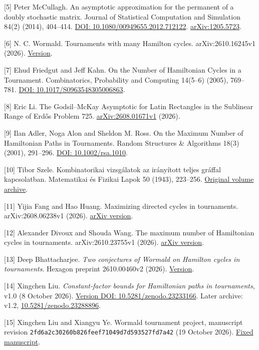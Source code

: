 \documentclass[11pt,a4paper]{article}
\begin{document}
{[}5{]} Peter McCullagh. An asymptotic approximation for the permanent of a doubly stochastic matrix. Journal of Statistical Computation and Simulation 84(2) (2014), 404--414. \href{https://doi.org/10.1080/00949655.2012.712122}{DOI: 10.1080/00949655.2012.712122}. \href{https://arxiv.org/abs/1205.5723}{arXiv:1205.5723}.

{[}6{]} N. C. Wormald. Tournaments with many Hamilton cycles. arXiv:2610.16245v1 (2026). \href{https://arxiv.org/html/2610.16245v1}{Version}.

{[}7{]} Ehud Friedgut and Jeff Kahn. On the Number of Hamiltonian Cycles in a Tournament. Combinatorics, Probability and Computing 14(5--6) (2005), 769--781. \href{https://doi.org/10.1017/S0963548305006863}{DOI: 10.1017/S0963548305006863}.

{[}8{]} Eric Li. The Godsil--McKay Asymptotic for Latin Rectangles in the Sublinear Range of Erdős Problem 725. \href{https://arxiv.org/html/2608.01671v1}{arXiv:2608.01671v1} (2026).

{[}9{]} Ilan Adler, Noga Alon and Sheldon M. Ross. On the Maximum Number of Hamiltonian Paths in Tournaments. Random Structures \& Algorithms 18(3) (2001), 291--296. \href{https://doi.org/10.1002/rsa.1010}{DOI: 10.1002/rsa.1010}.

{[}10{]} Tibor Szele. Kombinatorikai vizsgálatok az irányított teljes gráffal kapcsolatban. Matematikai és Fizikai Lapok 50 (1943), 223--256. \href{https://real-j.mtak.hu/7300/}{Original volume archive}.

{[}11{]} Yijia Fang and Hao Huang. Maximizing directed cycles in tournaments. arXiv:2608.06238v1 (2026). \href{https://arxiv.org/html/2608.06238v1\#S3}{arXiv version}.

{[}12{]} Alexander Divoux and Shouda Wang. The maximum number of Hamiltonian cycles in tournaments. arXiv:2610.23755v1 (2026). \href{https://arxiv.org/html/2610.23755v1}{arXiv version}.

{[}13{]} Deep Bhattacharjee. \emph{Two conjectures of Wormald on Hamilton cycles in tournaments}. Hexagon preprint 2610.00460v2 (2026). \href{https://hexagonmath.org/2610.00460v2}{Version}.

{[}14{]} Xingchen Liu. \emph{Constant-factor bounds for Hamiltonian paths in tournaments}, v1.0 (8 October 2026). \href{https://doi.org/10.5281/zenodo.23233166}{Version DOI: 10.5281/zenodo.23233166}. Later archive: v1.2, \href{https://doi.org/10.5281/zenodo.23288896}{10.5281/zenodo.23288896}.

{[}15{]} Xingchen Liu and Xiangyu Ye. Wormald tournament project, manuscript revision \nolinkurl{2fd6a2c30260b826feef71049d7d593527fd7a42} (19 October 2026). \href{https://github.com/LStar404/wormald-tournament-conjectures/blob/2fd6a2c30260b826feef71049d7d593527fd7a42/docs/paper.zh.md}{Fixed manuscript}.
\end{document}
